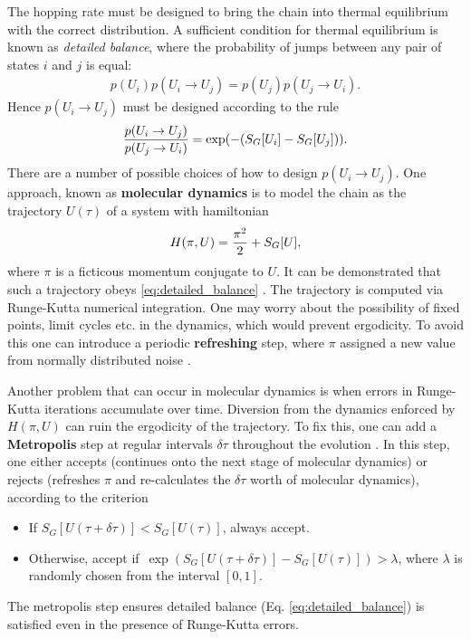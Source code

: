 The hopping rate must be designed to bring the chain into thermal equilibrium with the correct distribution. A sufficient condition for thermal equilibrium is known as {\it{detailed balance}}, where the probability of jumps between any pair of states $i$ and $j$ is equal:
\begin{align}
  p(U_i) p(U_i\to U_j) = p(U_j) p(U_j\to U_i).
\end{align}
Hence $p(U_i\to U_j)$ must be designed according to the rule
\begin{align}
  {p(U_i\to U_j) \over p(U_j\to U_i)} = \exp(-(S_G[U_i]-S_G[U_j])).
  \label{eq:detailed_balance}
\end{align}
There are a number of possible choices of how to design $p(U_i\to U_j)$. One approach, known as {\bf{molecular dynamics}} \cite{PhysRevLett.49.613,PhysRevD.28.1506} is to model the chain as the trajectory $U(\tau)$ of a system with hamiltonian
\begin{align}
  H(\pi,U) = {\pi^2\over 2} + S_G[U],
\end{align}
where $\pi$ is a ficticous momentum conjugate to $U$. It can be demonstrated that such a trajectory obeys \eqref{eq:detailed_balance} \cite{PhysRevLett.49.613}. The trajectory is computed via Runge-Kutta numerical integration. One may worry about the possibility of fixed points, limit cycles etc. in the dynamics, which would prevent ergodicity. To avoid this one can introduce a periodic {\bf{refreshing}} step, where $\pi$ assigned a new value from normally distributed noise \cite{PhysRevLett.55.2774,duane1986}.

Another problem that can occur in molecular dynamics is when errors in Runge-Kutta iterations accumulate over time. Diversion from the dynamics enforced by $H(\pi,U)$ can ruin the ergodicity of the trajectory. To fix this, one can add a {\bf{Metropolis}} step at regular intervals $\delta\tau$ throughout the evolution \cite{doi:10.1063/1.1699114}. In this step, one either accepts (continues onto the next stage of molecular dynamics) or rejects (refreshes $\pi$ and re-calculates the $\delta \tau$ worth of molecular dynamics), according to the criterion
\begin{itemize}
\item
  If $S_G[U(\tau+\delta\tau)] < S_G[U(\tau)]$, always accept.
\item
  Otherwise, accept if $\,\exp\left(S_G[U(\tau+\delta\tau)] - S_G[U(\tau)]\right) > \lambda$, where $\lambda$ is randomly chosen from the interval $[0,1]$.
\end{itemize}
The metropolis step ensures detailed balance (Eq. \eqref{eq:detailed_balance}) is satisfied even in the presence of Runge-Kutta errors.

